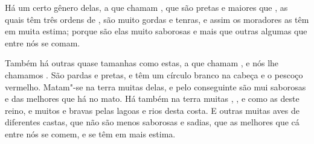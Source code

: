 Há um certo gênero delas, a que chamam , que são pretas e
maiores que , as quais têm três ordens de , são muito
gordas e tenras, e assim os moradores as têm em muita estima; porque são
elas muito saborosas e mais que outras algumas que entre nós se comam.

Também há outras quase tamanhas como estas, a que chamam , e nós
lhe chamamos . São pardas e pretas, e têm um círculo
branco na cabeça e o pescoço vermelho. Matam"-se na terra muitas delas,
e pelo conseguinte são mui saborosas e das melhores que há no mato. Há
também na terra muitas , , e  como as deste reino, e
muitos  e  bravas pelas
lagoas e rios desta costa. E outras muitas aves de diferentes castas,
que não são menos saborosas e sadias, que as melhores que cá entre nós \EP
se comem, e se têm em mais estima.

